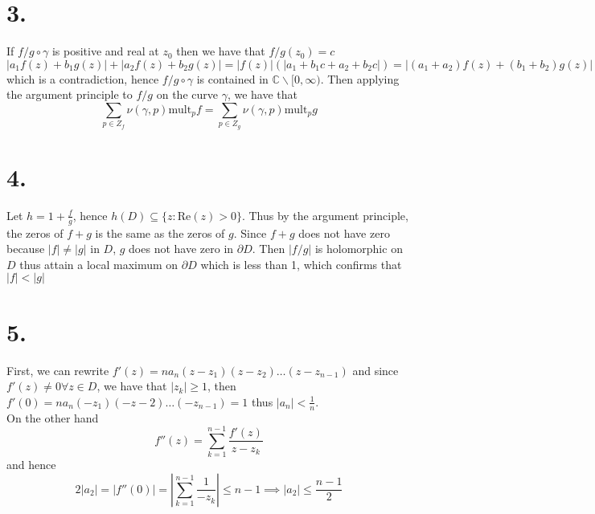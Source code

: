 \documentclass[11pt]{article}
\begin{document}
\section*{3.}
If $f/g \circ \gamma$ is positive and real at $z_0$ then we have that $f/g(z_0) = c$
\[
    |a_1f(z) + b_1g(z)| + |a_2f(z) + b_2g(z)| = |f(z)|(|a_1 + b_1c + a_2 + b_2c|) = |(a_1 + a_2)f(z) + (b_1 + b_2)g(z)|
\]
which is a contradiction, hence $f/g \circ \gamma$ is contained in $\mathbb{C} \backslash [0, \infty)$.
Then applying the argument principle to $f/g$ on the curve $\gamma$, we have that 
\[
    \sum_{p \in Z_f} \nu(\gamma, p) \text{mult}_p f = \sum_{p \in Z_g} \nu(\gamma, p) \text{mult}_p g
\]
\newpage
\section*{4.}
Let $h = 1 + \frac{f}{g}$, hence $h(D) \subseteq \{z: \text{Re}(z)> 0\}$. Thus by the argument principle, the zeros of $f+g$ is the same as the zeros of $g$. 
Since $f+g$ does not have zero because $|f|\ne |g|$ in $D$, $g$ does not have zero in $\partial D$. Then $|f/g|$ is holomorphic on $D$ thus attain a local maximum on $\partial D$ which is less than 1, which confirms that $|f|<|g|$
\newpage
\section*{5.}
First, we can rewrite $f'(z) = n a_n(z-z_1)(z-z_2)\hdots(z-z_{n-1})$ and since $f'(z) \ne 0 \forall z \in D$, we have that $|z_k|\ge1$, 
then $f'(0) = n a_n(-z_1)(-z-2)\hdots (-z_{n-1}) = 1$ thus $|a_n| < \frac{1}{n}$. \\
On the other hand 
\[
    f''(z) = \sum_{k=1}^{n-1} \frac{f'(z)}{z-z_k}
\]
and hence 
\[
    2|a_2| = |f''(0)| = \left|\sum_{k=1}^{n-1} \frac{1}{-z_k} \right| \le n-1 \implies |a_2| \le \frac{n-1}{2}
\]
\end{document}
